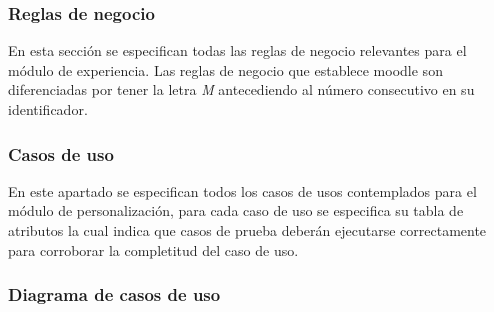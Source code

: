 \subsubsection{Reglas de negocio} %

 En esta sección se especifican todas las reglas de negocio relevantes para el módulo de
 experiencia. Las reglas de negocio que establece moodle son diferenciadas por tener la letra {\it M}
 antecediendo al número consecutivo en su identificador.


    
\clearpage


%
%



\subsubsection{Casos de uso} %

 En este apartado se especifican todos los casos de usos contemplados para el módulo de
 personalización, para cada caso de uso se especifica su tabla de atributos la cual indica que casos
 de prueba deberán ejecutarse correctamente para corroborar la completitud del caso de uso.

\subsubsection*{Diagrama de casos de uso}

